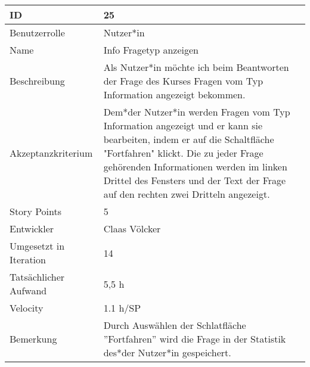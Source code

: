\begin{tabularx}{\textwidth}{|p{}|X|}
	\hline
	ID & 25\\
	\hline
	Benutzerrolle & Nutzer*in\\
	\hline
	Name & Info Fragetyp anzeigen\\
	\hline
	Beschreibung & Als Nutzer*in möchte ich beim Beantworten der Frage des Kurses Fragen vom Typ Information angezeigt bekommen.\\
	\hline
	Akzeptanzkriterium & Dem*der Nutzer*in werden Fragen vom Typ Information angezeigt und er kann sie bearbeiten, indem er auf die Schaltfläche "Fortfahren" klickt. Die zu jeder Frage gehörenden Informationen werden im linken Drittel des Fensters und der Text der Frage auf den rechten zwei Dritteln angezeigt.\\
	\hline
	Story Points & 5 \\
	\hline
	Entwickler & Claas Völcker \\
	\hline
	Umgesetzt in Iteration & 14\\
	\hline
	Tatsächlicher Aufwand & 5,5 h\\
	\hline
	Velocity & 1.1 h/SP\\
	\hline
	Bemerkung & Durch Auswählen der Schlatfläche ''Fortfahren'' wird die Frage in der Statistik des*der Nutzer*in gespeichert.\\
	\hline
\end{tabularx}
\vspace{20pt}
